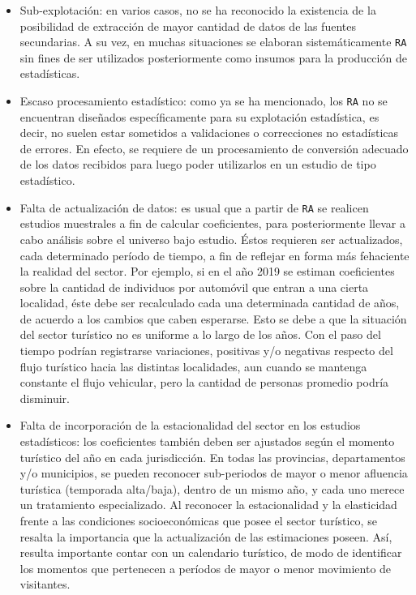 \documentclass[
]{book}
\begin{document}
\begin{itemize}
\item
  Sub-explotación: en varios casos, no se ha reconocido la existencia de la posibilidad de extracción de mayor cantidad de datos de las fuentes secundarias. A su vez, en muchas situaciones se elaboran sistemáticamente \texttt{RA} sin fines de ser utilizados posteriormente como insumos para la producción de estadísticas.
\item
  Escaso procesamiento estadístico: como ya se ha mencionado, los \texttt{RA} no se encuentran diseñados específicamente para su explotación estadística, es decir, no suelen estar sometidos a validaciones o correcciones no estadísticas de errores. En efecto, se requiere de un procesamiento de conversión adecuado de los datos recibidos para luego poder utilizarlos en un estudio de tipo estadístico.
\item
  Falta de actualización de datos: es usual que a partir de \texttt{RA} se realicen estudios muestrales a fin de calcular coeficientes, para posteriormente llevar a cabo análisis sobre el universo bajo estudio. Éstos requieren ser actualizados, cada determinado período de tiempo, a fin de reflejar en forma más fehaciente la realidad del sector. Por ejemplo, si en el año 2019 se estiman coeficientes sobre la cantidad de individuos por automóvil que entran a una cierta localidad, éste debe ser recalculado cada una determinada cantidad de años, de acuerdo a los cambios que caben esperarse. Esto se debe a que la situación del sector turístico no es uniforme a lo largo de los años. Con el paso del tiempo podrían registrarse variaciones, positivas y/o negativas respecto del flujo turístico hacia las distintas localidades, aun cuando se mantenga constante el flujo vehicular, pero la cantidad de personas promedio podría disminuir.
\item
  Falta de incorporación de la estacionalidad del sector en los estudios estadísticos: los coeficientes también deben ser ajustados según el momento turístico del año en cada jurisdicción. En todas las provincias, departamentos y/o municipios, se pueden reconocer sub-periodos de mayor o menor afluencia turística (temporada alta/baja), dentro de un mismo año, y cada uno merece un tratamiento especializado. Al reconocer la estacionalidad y la elasticidad frente a las condiciones socioeconómicas que posee el sector turístico, se resalta la importancia que la actualización de las estimaciones poseen. Así, resulta importante contar con un calendario turístico, de modo de identificar los momentos que pertenecen a períodos de mayor o menor movimiento de visitantes.
\end{itemize}
\end{document}
